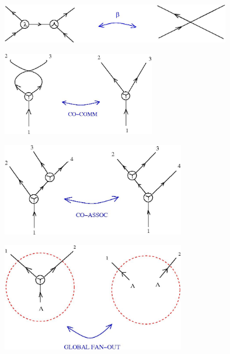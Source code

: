 \documentclass{article}
\begin{document}
\centerline{\includegraphics[width=0.75\textwidth]{../img/glc/beta_move_9.jpg}
}
\vspace{.5cm}


\vspace{.5cm}
\centerline{\includegraphics[width=0.5\textwidth]{../img/glc/commr.jpg}
}
\vspace{.5cm}

\vspace{.5cm}
 
\centerline{\includegraphics[width=0.6\textwidth]{../img/glc/assocr.jpg}
}
\vspace{.5cm}

\centerline{\includegraphics[width=0.6\textwidth]{../img/glc/fanoutr.jpg}
}
\vspace{.5cm}



\vspace{.5cm}
 
\end{document}
